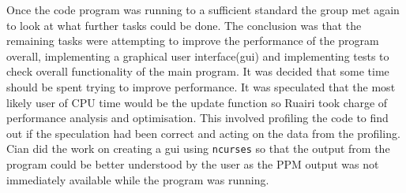 Once the code program was running to a sufficient standard the group met again to look at what further tasks could be done.
The conclusion was that the remaining tasks were attempting to improve the performance of the program overall, implementing a graphical user interface(gui) and implementing tests to check overall functionality of the main program.
It was decided that some time should be spent trying to improve performance.
It was speculated that the most likely user of CPU time would be the update function so Ruairi took charge of performance analysis and optimisation.
This involved profiling the code to find out if the speculation had been correct and acting on the data from the profiling.
Cian did the work on creating a gui using \texttt{ncurses} so that the output from the program could be better understood by the user as the PPM output was not immediately available while the program was running.

